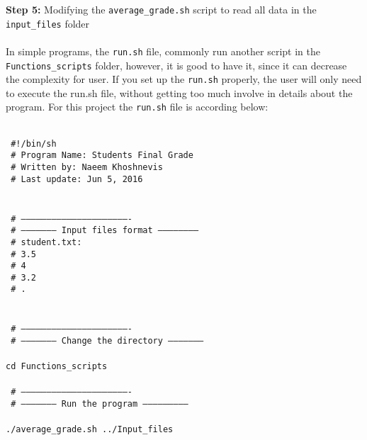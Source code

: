 \textbf{Step 5:} Modifying the  \texttt{average\_grade.sh} script to read all data in the \texttt{input\_files} folder \\
\\
\noindent
In simple programs, the \texttt{run.sh} file, commonly run another script in the \texttt{Functions\_scripts} folder, however, it is good to have it, since it can decrease the complexity for user. If you set up the \texttt{run.sh} properly, the user will only need to execute the run.sh file, without getting too much involve in details about the program. For this project the \texttt{run.sh} file is according below:\\

 \begin{mdframed}[hidealllines=true,backgroundcolor=gray!20]
 \begin{singlespace}
 \fontsize{10pt}{1pt}
\texttt{
\\
\noindent
{ \color{matlab_green}  \#!/bin/sh}\\
{ \color{matlab_green}  \# Program Name: Students Final Grade}\\
{ \color{matlab_green}  \# Written by: Naeem Khoshnevis}\\
{ \color{matlab_green}  \# Last update: Jun 5, 2016}\\
\\
\\
{ \color{matlab_green} \# ----------------------------------------------------------------} \\
{ \color{matlab_green} \# --------------------- Input files format -----------------------} \\
{ \color{matlab_green} \# student.txt:} \\
{ \color{matlab_green} \# 3.5} \\
{ \color{matlab_green} \# 4} \\
{ \color{matlab_green} \# 3.2} \\
{ \color{matlab_green} \# .} \\
\\
\\
{ \color{matlab_green} \# ----------------------------------------------------------------} \\
{ \color{matlab_green} \# --------------------- Change the directory ---------------------} \\
\\
cd \texttt{Functions\_scripts}\\
\\
{ \color{matlab_green} \# ----------------------------------------------------------------} \\
{ \color{matlab_green} \# --------------------- Run the program --------------------------} \\
\\
./average\_grade.sh ../Input\_files\\
 }
 \end{singlespace}
\end{mdframed}
